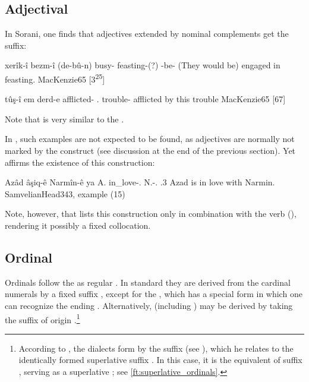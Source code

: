 \subsection{Adjectival \prims}

In Sorani, one finds that adjectives extended by nominal complements get the \ez* suffix: 

{xerîk-î bezm-î (de-bû-n)}
{busy-\ez{} feasting-\obl(?) \ind-be-\pl}
{(They would be) engaged in feasting.}
{MacKenzie}{65 {[3\textsuperscript{25}]}}

{tûş-î em derd-e}
{afflicted-\ez{} \dem.\near{} trouble-}
{afflicted by this trouble}
{MacKenzie}{65 {[67]}}

Note that  is very similar to the  \JSan {}. 

In \Kur, such examples are not expected to be found, as adjectives are normally not marked by the construct \ez* (see discussion at the end of the previous section). Yet  \citet[343]{SamvelianHead} affirms the existence of this construction:

{Azâd âşiq-ê Narmîn-ê ya}
{A. in\_love-\ez.\masc{} N.-\obl.\fem{} \cop.3\masc}
{Azad is in love with Narmin.}
{SamvelianHead}{343, example (15)}

Note, however, that \citet[197]{ThackstonKurmanji} lists this construction only in combination with the verb  (), rendering it possibly a fixed collocation. 

\subsection{Ordinal \secns} \label{ss:kurd_ez_ord}
\largerpage[1.5]
Ordinals follow the \ez* as regular \secns. In standard \Kur they are derived from the cardinal numerals by a fixed \obl* \pl* suffix , except for the  , which has a special form  in which one can recognize the \masc* \sg* \obl* ending . Alternatively,  (including ) may be derived by taking the suffix  of \Per origin \citep[25]{ThackstonKurmanji}.\footnote{According to \citet[170, \S 274.(a)]{MacKenzie}, the \Kur dialects form  by the  suffix  (see ), which he relates to the identically formed superlative suffix \citep[164, \S 268.(b)]{MacKenzie}. In this case, it is the equivalent of \Sor suffix , serving as a superlative \citep[68, \S 190.(b)]{MacKenzie}; see \vref{ft:superlative_ordinals}.\label{ft:superlative_e}}

